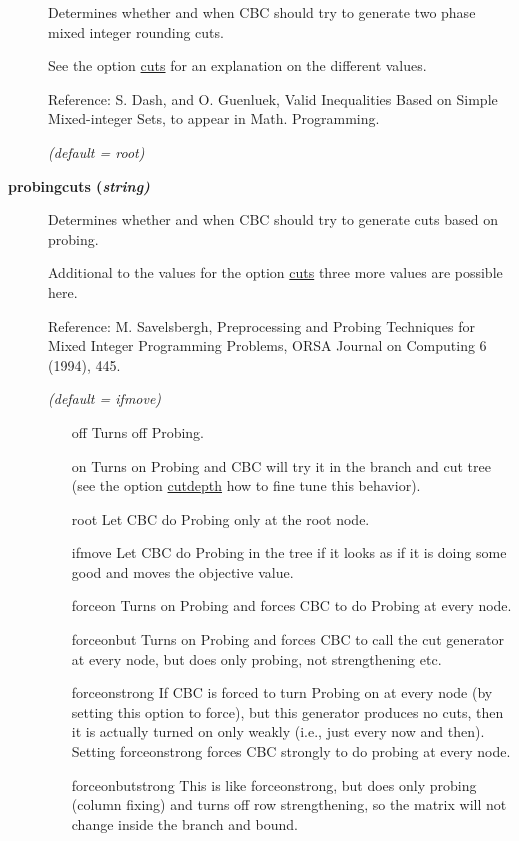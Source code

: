 \begin{description}
Determines whether and when CBC should try to generate two phase mixed integer rounding cuts.

See the option \hyperlink{cuts}{cuts} for an explanation on the different values.

Reference: S. Dash, and O. Guenluek, Valid Inequalities Based on Simple Mixed-integer Sets, to appear in Math. Programming.

\textsl{(default = root)}

\item[\label{probingcuts}\hypertarget{probingcuts}
{\textbf{probingcuts (\slshape{string})}}]\hspace{1.0in}

Determines whether and when CBC should try to generate cuts based on probing.

Additional to the values for the option \hyperlink{cuts}{cuts} three more values are possible here.

Reference: M. Savelsbergh, Preprocessing and Probing Techniques for Mixed Integer Programming Problems, ORSA Journal on Computing 6 (1994), 445.

\textsl{(default = ifmove)}
\begin{itemize}
\item[off] 
Turns off Probing.
\item[on] 
Turns on Probing and CBC will try it in the branch and cut tree (see the option \hyperlink{cutdepth}{cutdepth} how to fine tune this behavior).
\item[root] 
Let CBC do Probing only at the root node.
\item[ifmove] 
Let CBC do Probing in the tree if it looks as if it is doing some good and moves the objective value.
\item[forceon] 
Turns on Probing and forces CBC to do Probing at every node.
\item[forceonbut] 
Turns on Probing and forces CBC to call the cut generator at every node, but does only probing, not strengthening etc.
\item[forceonstrong] 
If CBC is forced to turn Probing on at every node (by setting this option to force), but this generator produces no cuts, then it is actually turned on only weakly (i.e., just every now and then).
Setting forceonstrong forces CBC strongly to do probing at every node.
\item[forceonbutstrong] 
This is like forceonstrong, but does only probing (column fixing) and turns off row strengthening, so the matrix will not change inside the branch and bound.
\end{itemize}


\end{description}
